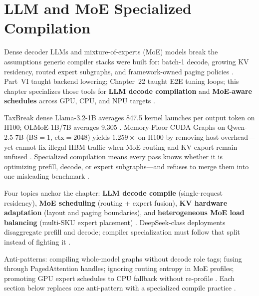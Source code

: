 \chapter{LLM and MoE Specialized Compilation}
\label{chap:ch23}

Dense decoder LLMs and mixture-of-experts (MoE) models break the assumptions generic compiler stacks were built for: batch-1 decode, growing KV residency, routed expert subgraphs, and framework-owned paging policies \citep{patel2025llminference,kwon2023vllm,liu2024deepseekv3,taxbreak2026}. Part~VI taught backend lowering; Chapter~22 taught E2E tuning loops; this chapter specializes those tools for \textbf{LLM decode compilation} and \textbf{MoE-aware schedules} across GPU, CPU, and NPU targets \citep{chen2020compilerbasedhardw,yirage2026,amd2024xdna,amd2024aie,dlbook}.

TaxBreak dense Llama-3.2-1B averages 847.5 kernel launches per output token on H100; OLMoE-1B/7B averages 9,305 \citep{taxbreak2026}. Memory-Floor CUDA Graphs on Qwen-2.5-7B (BS${=}1$, ctx${=}2048$) yields $1.259\times$ on H100 by removing host overhead---yet cannot fix illegal HBM traffic when MoE routing and KV export remain unfused \citep{memoryfloor2026,nvidia2024cudagraphs,liu2024deepseekv3}. Specialized compilation means every pass knows whether it is optimizing prefill, decode, or expert subgraphs---and refuses to merge them into one misleading benchmark \citep{patel2025llminference,dao2022flashattention,dao2023flashdecoding,kwon2023vllm,yirage2026,chen2020compilerbasedhardw}.

Four topics anchor the chapter: \textbf{LLM decode compile} (single-request residency), \textbf{MoE scheduling} (routing + expert fusion), \textbf{KV hardware adaptation} (layout and paging boundaries), and \textbf{heterogeneous MoE load balancing} (multi-SKU expert placement) \citep{liu2024deepseekv3,amd2024xdna,semianalysis2024tma,dlbook}. DeepSeek-class deployments disaggregate prefill and decode; compiler specialization must follow that split instead of fighting it \citep{patel2025llminference,liu2024deepseekv3,kwon2023vllm,yirage2026,chen2020compilerbasedhardw,memoryfloor2026,taxbreak2026,amd2024aie,dao2022flashattention,dao2023flashdecoding,nvidia2024cudagraphs,nvidia2022hopper}.

Anti-patterns: compiling whole-model graphs without decode role tags; fusing through PagedAttention handles; ignoring routing entropy in MoE profiles; promoting GPU expert schedules to CPU fallback without re-profile \citep{kwon2023vllm,liu2024deepseekv3,patel2025llminference,yirage2026,chen2020compilerbasedhardw,memoryfloor2026,taxbreak2026,amd2024aie,dlbook,dao2022flashattention,dao2023flashdecoding,nvidia2024cudagraphs,nvidia2022hopper,semianalysis2024tma,amd2024xdna}. Each section below replaces one anti-pattern with a specialized compile practice \citep{yirage2026,chen2020compilerbasedhardw,patel2025llminference,kwon2023vllm,liu2024deepseekv3,memoryfloor2026,taxbreak2026,amd2024aie,dlbook,dao2022flashattention,dao2023flashdecoding,nvidia2024cudagraphs,nvidia2022hopper,semianalysis2024tma,amd2024xdna}.


